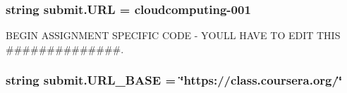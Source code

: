\subsubsection[{U\+R\+L}]{\setlength{\rightskip}{0pt plus 5cm}string submit.\+U\+R\+L = \textquotesingle{}cloudcomputing-\/001\textquotesingle{}}\label{namespacesubmit_a479f856e3e67398d574766a49993a7ce}


B\+E\+G\+I\+N A\+S\+S\+I\+G\+N\+M\+E\+N\+T S\+P\+E\+C\+I\+F\+I\+C C\+O\+D\+E -\/ Y\+O\+U\textquotesingle{}L\+L H\+A\+V\+E T\+O E\+D\+I\+T T\+H\+I\+S \#\#\#\#\#\#\#\#\#\#\#\#\#\#. 

\hypertarget{namespacesubmit_ab259c580b161da6b25eb9e307a6ff891}{}
\subsubsection[{U\+R\+L\+\_\+\+B\+A\+S\+E}]{\setlength{\rightskip}{0pt plus 5cm}string submit.\+U\+R\+L\+\_\+\+B\+A\+S\+E = \char`\"{}https\+://class.\+coursera.\+org/\char`\"{}}\label{namespacesubmit_ab259c580b161da6b25eb9e307a6ff891}
